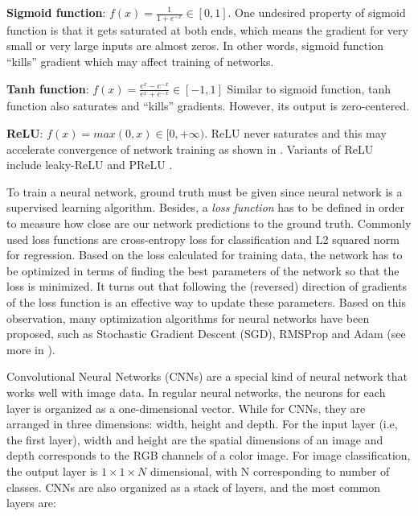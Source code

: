 \begin{my_enumerate}
\item \textbf{Sigmoid function}: $f(x)=\frac{1}{1+e^{-x}} \in [0, 1]$. One undesired property of sigmoid function is that it gets saturated at both ends, which means the gradient for very small or very large inputs are almost zeros. In other words, sigmoid function ``kills'' gradient which may affect training of networks. 
\item \textbf{Tanh function}: $f(x)=\frac{e^x-e^{-x}}{e^x+e^{-x}} \in [-1, 1]$ Similar to sigmoid function, tanh function also saturates and ``kills'' gradients. However, its output is zero-centered.
\item \textbf{ReLU}: $f(x)=max(0, x) \in [0, +\infty)$. ReLU never saturates and this may accelerate convergence of network training as shown in \cite{krizhevsky2012imagenet}. Variants of ReLU include leaky-ReLU and PReLU \cite{he2015delving}.
\end{my_enumerate}

To train a neural network, ground truth must be given since neural network is a supervised learning algorithm. Besides, a \textit{loss function} has to be defined in order to measure how close are our network predictions to the ground truth. Commonly used loss functions are cross-entropy loss for classification and L2 squared norm for regression. Based on the loss calculated for training data, the network has to be optimized in terms of finding the best parameters of the network so that the loss is minimized. It turns out that following the (reversed) direction of gradients of the loss function is an effective way to update these parameters. Based on this observation, many optimization algorithms for neural networks have been proposed, such as Stochastic Gradient Descent (SGD), RMSProp and Adam (see more in \cite{ruder2016overview}). 

Convolutional Neural Networks (CNNs) are a special kind of neural network that works well with image data. In regular neural networks, the neurons for each layer is organized as a one-dimensional vector. While for CNNs, they are arranged in three dimensions: width, height and depth. For the input layer (i.e, the first layer), width and height are the spatial dimensions of an image and depth corresponds to the RGB channels of a color image. For image classification, the output layer is $1\times1\times N$ dimensional, with N corresponding to number of classes. CNNs are also organized as a stack of layers, and the most common layers are:

